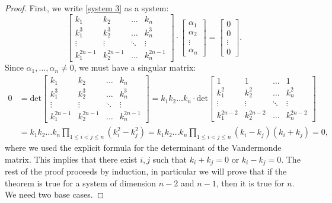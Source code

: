 \documentclass[a4paper,10pt,reqno]{article}
\theoremstyle{definition}
\theoremstyle{plain}
\theoremstyle{plain}
\theoremstyle{definition}
\theoremstyle{plain}
\theoremstyle{plain}
\theoremstyle{plain}
\theoremstyle{definition}
\theoremstyle{definition}
\begin{document}
\begin{proof}
First, we write \eqref{system 3} as a system:
\[
\begin{bmatrix}
k_1 & k_2  & \dots  & k_n \\
k_1^3 & k_2^3 & \dots  & k_n^3 \\
\vdots & \vdots & \ddots & \vdots \\
k_1^{2n-1} & k_2^{2n-1} & \dots  & k_n^{2n-1}
\end{bmatrix} 
\cdot
\begin{bmatrix}
\alpha_1 \\
\alpha_2 \\
\vdots \\
\alpha_n
\end{bmatrix}
=
\begin{bmatrix}
0 \\
0 \\
\vdots \\
0
\end{bmatrix}.
\]
Since $\alpha_1,\ldots,\alpha_n\neq 0$, we must have a singular matrix: 
\begin{equation} 
\begin{split}
0 & = \mathrm{det}
\begin{bmatrix}
k_1 & k_2  & \dots  & k_n \\
k_1^3 & k_2^3 & \dots  & k_n^3 \\
\vdots & \vdots & \ddots & \vdots \\
k_1^{2n-1} & k_2^{2n-1} & \dots  & k_n^{2n-1}
\end{bmatrix}
= k_1k_2\dots k_n \cdot \mathrm{det}
\begin{bmatrix}
1 & 1  & \dots  & 1 \\
k_1^2 & k_2^2 & \dots  & k_n^2 \\
\vdots & \vdots & \ddots & \vdots \\
k_1^{2n-2} & k_2^{2n-2} & \dots  & k_n^{2n-2}
\end{bmatrix} \\
& = k_1k_2\dots k_n \prod_{1 \le i < j \le n} (k_i^2-k_j^2) = k_1k_2\dots k_n \prod_{1 \le i < j \le n}(k_i-k_j)(k_i+k_j)=0,
\label{vandermonde2}
\end{split}
\end{equation}
where we used the explicit formula for the determinant of the Vandermonde matrix.
This implies that there exist $i,j$ such that $k_i+k_j=0$ or $k_i-k_j=0$. 
The rest of the proof proceeds by induction, in particular we will prove that if the theorem is true for a system of dimension $n-2$ and $n-1$, then it is true for $n$. We need two base cases.


\end{proof}
\end{document}
